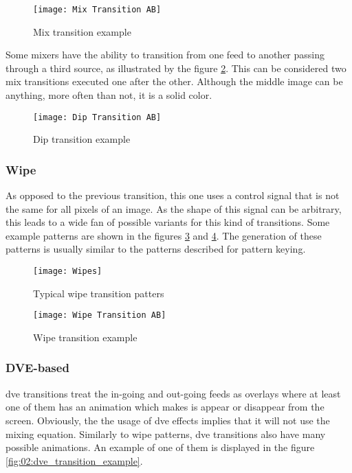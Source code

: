 \documentclass[../main.tex]{subfiles}
\begin{document}
\begin{figure}[htbp]
    \centering
    \texttt{[image: Mix Transition AB]}
    \caption{Mix transition example}
    \label{fig:02:mix_transition_example}
\end{figure}

Some mixers have the ability to transition from one feed to another passing through a third source, as illustrated by the figure \ref{fig:02:dip_transition_example}. This can be considered two mix transitions executed one after the other. Although the middle image can be anything, more often than not, it is a solid color\cite{atemManual}.\newline

\begin{figure}[htbp]
    \centering
    \texttt{[image: Dip Transition AB]}
    \caption{Dip transition example}
    \label{fig:02:dip_transition_example}
\end{figure}

\subsubsection{Wipe}
As opposed to the previous transition, this one uses a control signal that is not the same for all \glspl{pixel} of an image. As the shape of this signal can be arbitrary, this leads to a wide fan of possible variants for this kind of transitions. Some example patterns are shown in the figures \ref{fig:02:wipes} and \ref{fig:02:wipe_transition_example}. The generation of these patterns is usually similar to the patterns described for pattern keying.\newline

\begin{figure}[htbp]
    \centering
    \texttt{[image: Wipes]}
    \caption{Typical wipe transition patters}
    \label{fig:02:wipes}
\end{figure}

\begin{figure}[htbp]
    \centering
    \texttt{[image: Wipe Transition AB]}
    \caption{Wipe transition example}
    \label{fig:02:wipe_transition_example}
\end{figure}

\subsubsection{DVE-based}
\Gls{dve} transitions treat the in-going and out-going feeds as overlays where at least one of them has an animation which makes is appear or disappear from the screen. Obviously, the the usage of \gls{dve} effects implies that it will not use the mixing equation. Similarly to wipe patterns, \gls{dve} transitions also have many possible animations. An example of one of them is displayed in the figure \ref{fig:02:dve_transition_example}.\newline
\end{document}
